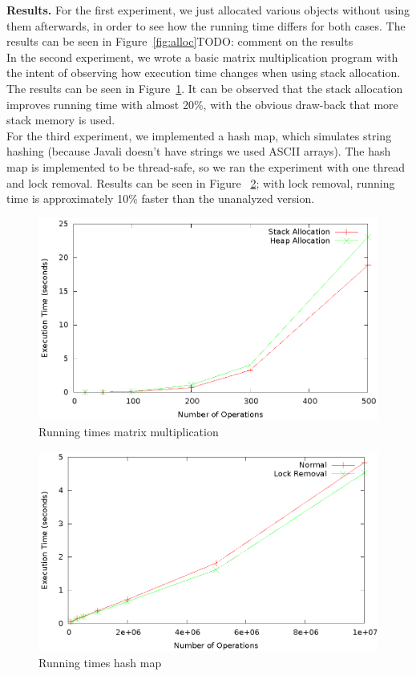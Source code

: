 \documentclass[letterpaper]{article}
\newcommand{\mypar}[1]{{\bf #1.}}
\begin{document}
\mypar{Results}
For the first experiment, we just allocated various objects without using them afterwards, in order to see how the running time differs
for both cases. The results can be seen in Figure~\ref{fig:alloc}TODO: comment on the results\\

In the second experiment, we wrote a basic matrix multiplication program with the intent of observing how execution time changes when using
stack allocation. The results can be seen in Figure~\ref{fig:matrixmul}. It can be observed that the stack allocation improves running
time with almost 20\%, with the obvious draw-back that more stack memory is used.\\

For the third experiment, we implemented a hash map, which simulates string hashing (because Javali doesn't have strings we used ASCII arrays).
The hash map is implemented to be thread-safe, so we ran the experiment with one thread and lock removal. Results can be seen in Figure~
\ref{fig:hash}; with lock removal, running time is approximately 10\% faster than the unanalyzed version.\\

\begin{figure} \center
 \includegraphics[width=0.8\linewidth]{results_matrix_mul.eps}
  \caption{Running times matrix multiplication}
  \label{fig:matrixmul}
\end{figure}

\begin{figure} \center
 \includegraphics[width=0.8\linewidth]{results_hash.eps}
  \caption{Running times hash map}
  \label{fig:hash}
\end{figure}
\end{document}
